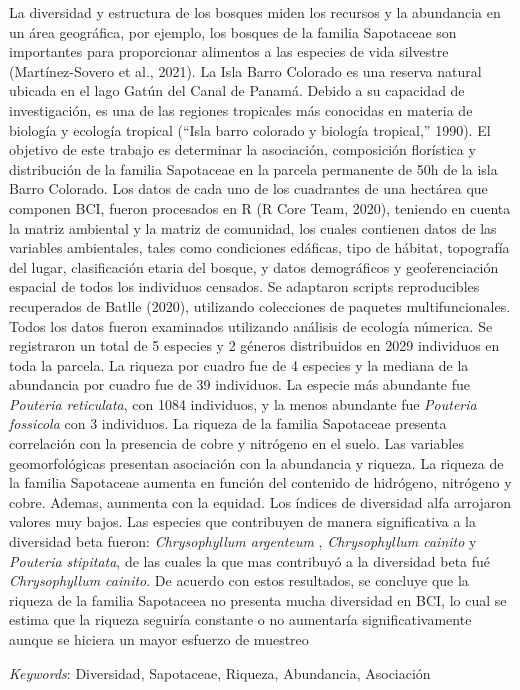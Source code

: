 \documentclass[11pt,]{article}
\renewenvironment{abstract}
 {{%
    \setlength{\leftmargin}{0mm}
    \setlength{\rightmargin}{\leftmargin}%
  }%
  \relax}
 {\endlist}
\begin{document}
\begin{abstract}

    \hbox{\vrule height .2pt width 39.14pc}

    \vskip 8.5pt %

\noindent La diversidad y estructura de los bosques miden los recursos y la
abundancia en un área geográfica, por ejemplo, los bosques de la familia
Sapotaceae son importantes para proporcionar alimentos a las especies de
vida silvestre (Martínez-Sovero et al., 2021). La Isla Barro Colorado es
una reserva natural ubicada en el lago Gatún del Canal de Panamá. Debido
a su capacidad de investigación, es una de las regiones tropicales más
conocidas en materia de biología y ecología tropical (``Isla barro
colorado y biología tropical,'' 1990). El objetivo de este trabajo es
determinar la asociación, composición florística y distribución de la
familia Sapotaceae en la parcela permanente de 50h de la isla Barro
Colorado. Los datos de cada uno de los cuadrantes de una hectárea que
componen BCI, fueron procesados en R (R Core Team, 2020), teniendo en
cuenta la matriz ambiental y la matriz de comunidad, los cuales
contienen datos de las variables ambientales, tales como condiciones
edáficas, tipo de hábitat, topografía del lugar, clasificación etaria
del bosque, y datos demográficos y geoferenciación espacial de todos los
individuos censados. Se adaptaron scripts reproducibles recuperados de
Batlle (2020), utilizando colecciones de paquetes multifuncionales.
Todos los datos fueron examinados utilizando análisis de ecología
númerica. Se registraron un total de 5 especies y 2 géneros distribuidos
en 2029 individuos en toda la parcela. La riqueza por cuadro fue de 4
especies y la mediana de la abundancia por cuadro fue de 39 individuos.
La especie más abundante fue \emph{Pouteria reticulata}, con 1084
individuos, y la menos abundante fue \emph{Pouteria fossicola} con 3
individuos. La riqueza de la familia Sapotaceae presenta correlación con
la presencia de cobre y nitrógeno en el suelo. Las variables
geomorfológicas presentan asociación con la abundancia y riqueza. La
riqueza de la familia Sapotaceae aumenta en función del contenido de
hidrógeno, nitrógeno y cobre. Ademas, aunmenta con la equidad. Los
índices de diversidad alfa arrojaron valores muy bajos. Las especies que
contribuyen de manera significativa a la diversidad beta fueron:
\emph{Chrysophyllum argenteum} , \emph{Chrysophyllum cainito} y
\emph{Pouteria stipitata}, de las cuales la que mas contribuyó a la
diversidad beta fué \emph{Chrysophyllum cainito}. De acuerdo con estos
resultados, se concluye que la riqueza de la familia Sapotaceea no
presenta mucha diversidad en BCI, lo cual se estima que la riqueza
seguiría constante o no aumentaría significativamente aunque se hiciera
un mayor esfuerzo de muestreo


\vskip 8.5pt \noindent \emph{Keywords}: Diversidad, Sapotaceae, Riqueza, Abundancia, Asociación \par

    \hbox{\vrule height .2pt width 39.14pc}



\end{abstract}
\end{document}
